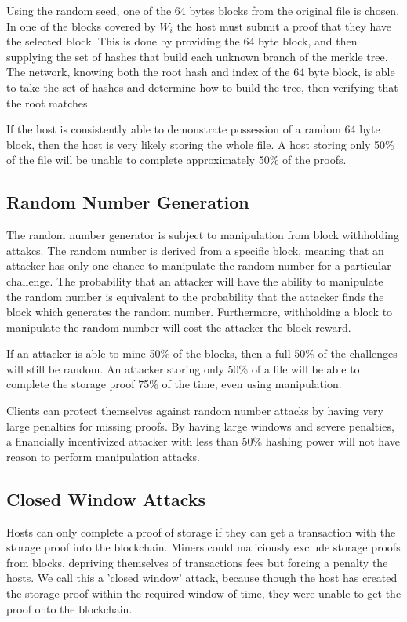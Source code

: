 \documentclass[twocolumn]{article}
\begin{document}
Using the random seed, one of the 64 bytes blocks from the original file is chosen.
In one of the blocks covered by $W_i$ the host must submit a proof that they have the selected block.
This is done by providing the 64 byte block, and then supplying the set of hashes that build each unknown branch of the merkle tree.
The network, knowing both the root hash and index of the 64 byte block, is able to take the set of hashes and determine how to build the tree, then verifying that the root matches.

If the host is consistently able to demonstrate possession of a random 64 byte block, then the host is very likely storing the whole file.
A host storing only 50\% of the file will be unable to complete approximately 50\% of the proofs.

\subsection{Random Number Generation}
The random number generator is subject to manipulation from block withholding attakcs.
The random number is derived from a specific block, meaning that an attacker has only one chance to manipulate the random number for a particular challenge.
The probability that an attacker will have the ability to manipulate the random number is equivalent to the probability that the attacker finds the block which generates the random number.
Furthermore, withholding a block to manipulate the random number will cost the attacker the block reward.

If an attacker is able to mine 50\% of the blocks, then a full 50\% of the challenges will still be random.
An attacker storing only 50\% of a file will be able to complete the storage proof 75\% of the time, even using manipulation.

Clients can protect themselves against random number attacks by having very large penalties for missing proofs.
By having large windows and severe penalties, a financially incentivized attacker with less than 50\% hashing power will not have reason to perform manipulation attacks.

\subsection{Closed Window Attacks}
Hosts can only complete a proof of storage if they can get a transaction with the storage proof into the blockchain.
Miners could maliciously exclude storage proofs from blocks, depriving themselves of transactions fees but forcing a penalty the hosts.
We call this a 'closed window' attack, because though the host has created the storage proof within the required window of time, they were unable to get the proof onto the blockchain.
\end{document}
